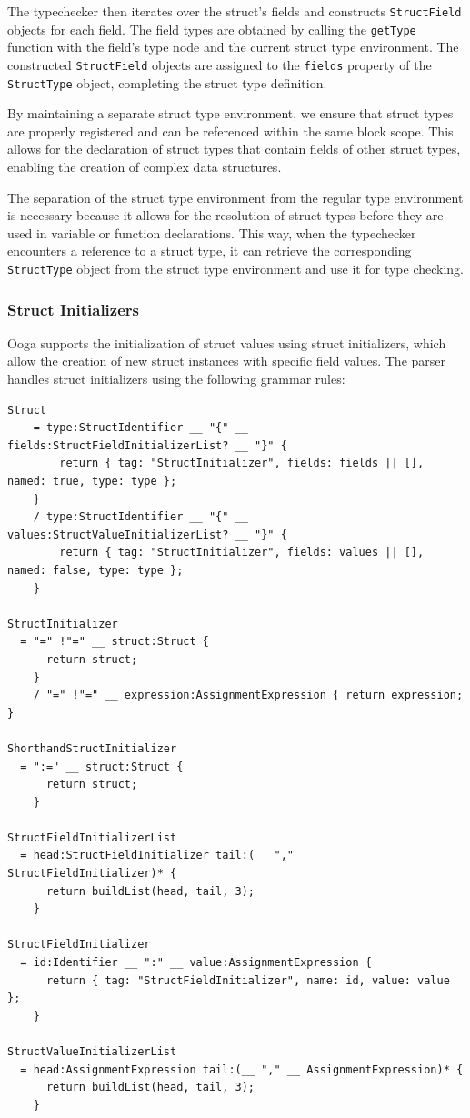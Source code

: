 \documentclass{report}
\begin{document}
The typechecker then iterates over the struct's fields and constructs \texttt{StructField} objects for each field. The field types are obtained by calling the \texttt{getType} function with the field's type node and the current struct type environment. The constructed \texttt{StructField} objects are assigned to the \texttt{fields} property of the \texttt{StructType} object, completing the struct type definition.

By maintaining a separate struct type environment, we ensure that struct types are properly registered and can be referenced within the same block scope. This allows for the declaration of struct types that contain fields of other struct types, enabling the creation of complex data structures.

The separation of the struct type environment from the regular type environment is necessary because it allows for the resolution of struct types before they are used in variable or function declarations. This way, when the typechecker encounters a reference to a struct type, it can retrieve the corresponding \texttt{StructType} object from the struct type environment and use it for type checking.

\subsubsection{Struct Initializers}

Ooga supports the initialization of struct values using struct initializers, which allow the creation of new struct instances with specific field values. The parser handles struct initializers using the following grammar rules:

\begin{verbatim}
Struct
    = type:StructIdentifier __ "{" __ fields:StructFieldInitializerList? __ "}" {
        return { tag: "StructInitializer", fields: fields || [], named: true, type: type };
    }
    / type:StructIdentifier __ "{" __ values:StructValueInitializerList? __ "}" {
        return { tag: "StructInitializer", fields: values || [], named: false, type: type };
    }

StructInitializer
  = "=" !"=" __ struct:Struct {
      return struct;
    }
    / "=" !"=" __ expression:AssignmentExpression { return expression; }

ShorthandStructInitializer
  = ":=" __ struct:Struct {
      return struct;
    }

StructFieldInitializerList
  = head:StructFieldInitializer tail:(__ "," __ StructFieldInitializer)* {
      return buildList(head, tail, 3);
    }

StructFieldInitializer
  = id:Identifier __ ":" __ value:AssignmentExpression {
      return { tag: "StructFieldInitializer", name: id, value: value };
    }

StructValueInitializerList
  = head:AssignmentExpression tail:(__ "," __ AssignmentExpression)* {
      return buildList(head, tail, 3);
    }
\end{verbatim}
\end{document}

